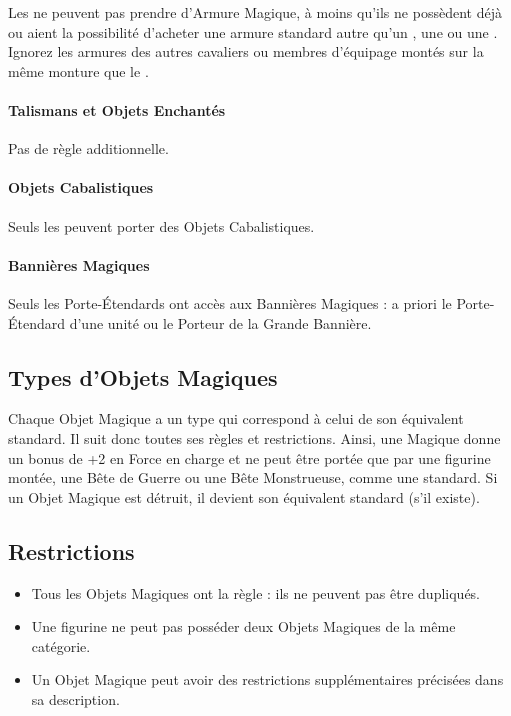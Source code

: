 Les \wizards{} ne peuvent pas prendre d'Armure Magique, à moins qu'ils ne possèdent déjà ou aient la possibilité d'acheter une armure standard autre qu'un \barding{}, une \innatedefence{} ou une \mountsprotection{}. Ignorez les armures des autres cavaliers ou membres d'équipage montés sur la même monture que le \wizard{}.

\paragraph{Talismans et Objets Enchantés}

Pas de règle additionnelle.

\paragraph{Objets Cabalistiques}

Seuls les \wizards{} peuvent porter des Objets Cabalistiques.

\paragraph{Bannières Magiques}

Seuls les Porte-Étendards ont accès aux Bannières Magiques : a priori le Porte-Étendard d'une unité ou le Porteur de la Grande Bannière.

\subsection{Types d'Objets Magiques}

Chaque Objet Magique a un type qui correspond à celui de son équivalent standard. Il suit donc toutes ses règles et restrictions. Ainsi, une \lance{} Magique donne un bonus de +2 en Force en charge et ne peut être portée que par une figurine montée, une Bête de Guerre ou une Bête Monstrueuse, comme une \lance{} standard. Si un Objet Magique est détruit, il devient son équivalent standard (s'il existe).

\subsection{Restrictions}

\begin{itemize}[label={\textbullet}]
\item Tous les Objets Magiques ont la règle \oneperarmy{} : ils ne peuvent pas être dupliqués.
\item Une figurine ne peut pas posséder deux Objets Magiques de la même catégorie.
\item Un Objet Magique peut avoir des restrictions supplémentaires précisées dans sa description.
\end{itemize}

